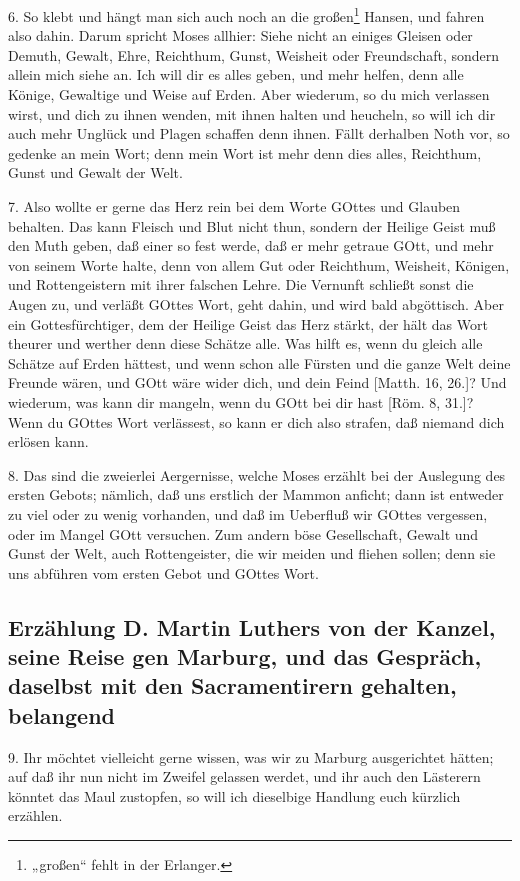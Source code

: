 6. So klebt und hängt man sich auch noch an die großen\footnote{„großen“ fehlt in der Erlanger.} Hansen, und fahren also dahin. Darum spricht Moses allhier: Siehe nicht an einiges Gleisen oder Demuth, Gewalt, Ehre, Reichthum, Gunst, Weisheit oder Freundschaft, sondern allein mich siehe an. Ich will dir es alles geben, und mehr helfen, denn alle Könige, Gewaltige und Weise auf Erden. Aber wiederum, so du mich verlassen wirst, und dich zu ihnen wenden, mit ihnen halten und heucheln, so will ich dir auch mehr Unglück und Plagen schaffen denn ihnen. Fällt derhalben Noth vor, so gedenke an mein Wort; denn mein Wort ist mehr denn dies alles, Reichthum, Gunst und Gewalt der Welt.

7. Also wollte er gerne das Herz rein bei dem Worte GOttes und Glauben behalten. Das kann Fleisch und Blut nicht thun, sondern der Heilige Geist muß den Muth geben, daß einer so fest werde, daß er mehr getraue GOtt, und mehr von seinem Worte halte, denn von allem Gut oder Reichthum, Weisheit, Königen, und Rottengeistern mit ihrer falschen Lehre. Die Vernunft schließt sonst die Augen zu, und verläßt GOttes Wort, geht dahin, und wird bald abgöttisch. Aber ein Gottesfürchtiger, dem der Heilige Geist das Herz stärkt, der hält das Wort theurer und werther denn diese Schätze alle. Was hilft es, wenn du gleich alle Schätze auf Erden hättest, und wenn schon alle Fürsten und die ganze Welt deine Freunde wären, und GOtt wäre wider dich, und dein Feind [Matth. 16, 26.]? Und wiederum, was kann dir mangeln, wenn du GOtt bei dir hast [Röm. 8, 31.]? Wenn du GOttes Wort verlässest, so kann er dich also strafen, daß niemand dich erlösen kann.

8. Das sind die zweierlei Aergernisse, welche Moses erzählt bei der Auslegung des ersten Gebots; nämlich, daß uns erstlich der Mammon anficht; dann ist entweder zu viel oder zu wenig vorhanden, und daß im Ueberfluß wir GOttes vergessen, oder im Mangel GOtt versuchen. Zum andern böse Gesellschaft, Gewalt und Gunst der Welt, auch Rottengeister, die wir meiden und fliehen sollen; denn sie uns abführen vom ersten Gebot und GOttes Wort.

\subsection[Erzählung D. Martin Luthers von der Kanzel, seine Reise]{Erzählung D. Martin Luthers von der Kanzel, seine Reise gen Marburg, und das Gespräch, daselbst mit den Sacramentirern gehalten, belangend}

9. Ihr möchtet vielleicht gerne wissen, was wir zu Marburg ausgerichtet hätten; auf daß ihr nun nicht im Zweifel gelassen werdet, und ihr auch den Lästerern könntet das Maul zustopfen, so will ich dieselbige Handlung euch kürzlich erzählen.

